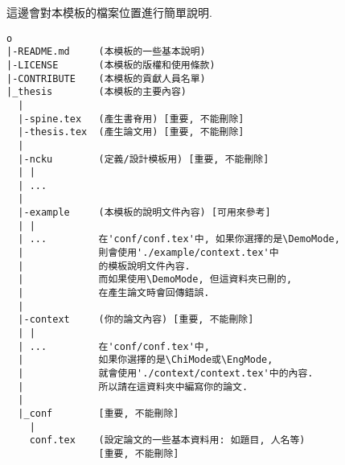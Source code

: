 
這邊會對本模板的檔案位置進行簡單說明.

\begin{framed}
\begin{verbatim}
o
|-README.md     (本模板的一些基本說明)
|-LICENSE       (本模板的版權和使用條款)
|-CONTRIBUTE    (本模板的貢獻人員名單)
|_thesis        (本模板的主要內容)
  |
  |-spine.tex   (產生書脊用) [重要, 不能刪除]
  |-thesis.tex  (產生論文用) [重要, 不能刪除]
  | 
  |-ncku        (定義/設計模板用) [重要, 不能刪除]
  | |
  | ...
  |
  |-example     (本模板的說明文件內容) [可用來參考]
  | |
  | ...         在'conf/conf.tex'中, 如果你選擇的是\DemoMode,
  |             則會使用'./example/context.tex'中
  |             的模板說明文件內容.
  |             而如果使用\DemoMode, 但這資料夾已刪的,
  |             在產生論文時會回傳錯誤.
  |
  |-context     (你的論文內容) [重要, 不能刪除]
  | |
  | ...         在'conf/conf.tex'中,
  |             如果你選擇的是\ChiMode或\EngMode,
  |             就會使用'./context/context.tex'中的內容.
  |             所以請在這資料夾中編寫你的論文.
  |
  |_conf        [重要, 不能刪除]
    |
    conf.tex    (設定論文的一些基本資料用: 如題目, 人名等)
                [重要, 不能刪除]
\end{verbatim}
\end{framed}

